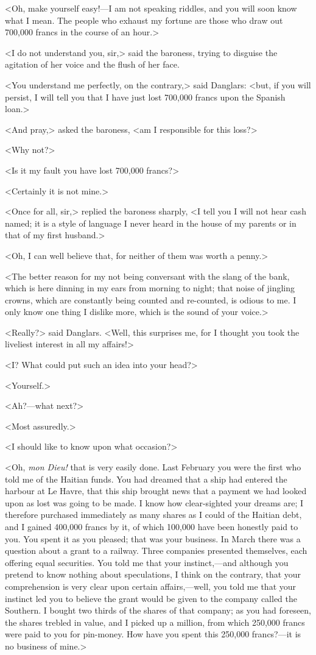  <Oh, make yourself easy!—I am not speaking riddles, and you will soon know what I mean. The people who exhaust my fortune are those who draw out 700,000 francs in the course of an hour.> 

 <I do not understand you, sir,> said the baroness, trying to disguise the agitation of her voice and the flush of her face. 

 <You understand me perfectly, on the contrary,> said Danglars: <but, if you will persist, I will tell you that I have just lost 700,000 francs upon the Spanish loan.> 

 <And pray,> asked the baroness, <am I responsible for this loss?> 

 <Why not?> 

 <Is it my fault you have lost 700,000 francs?> 

 <Certainly it is not mine.> 

 <Once for all, sir,> replied the baroness sharply, <I tell you I will not hear cash named; it is a style of language I never heard in the house of my parents or in that of my first husband.> 

 <Oh, I can well believe that, for neither of them was worth a penny.> 

 <The better reason for my not being conversant with the slang of the bank, which is here dinning in my ears from morning to night; that noise of jingling crowns, which are constantly being counted and re-counted, is odious to me. I only know one thing I dislike more, which is the sound of your voice.> 

 <Really?> said Danglars. <Well, this surprises me, for I thought you took the liveliest interest in all my affairs!>

<I? What could put such an idea into your head?> 

 <Yourself.> 

 <Ah?—what next?> 

 <Most assuredly.> 

 <I should like to know upon what occasion?> 

 <Oh, \textit{mon Dieu!} that is very easily done. Last February you were the first who told me of the Haitian funds. You had dreamed that a ship had entered the harbour at Le Havre, that this ship brought news that a payment we had looked upon as lost was going to be made. I know how clear-sighted your dreams are; I therefore purchased immediately as many shares as I could of the Haitian debt, and I gained 400,000 francs by it, of which 100,000 have been honestly paid to you. You spent it as you pleased; that was your business. In March there was a question about a grant to a railway. Three companies presented themselves, each offering equal securities. You told me that your instinct,—and although you pretend to know nothing about speculations, I think on the contrary, that your comprehension is very clear upon certain affairs,—well, you told me that your instinct led you to believe the grant would be given to the company called the Southern. I bought two thirds of the shares of that company; as you had foreseen, the shares trebled in value, and I picked up a million, from which 250,000 francs were paid to you for pin-money. How have you spent this 250,000 francs?—it is no business of mine.> 

